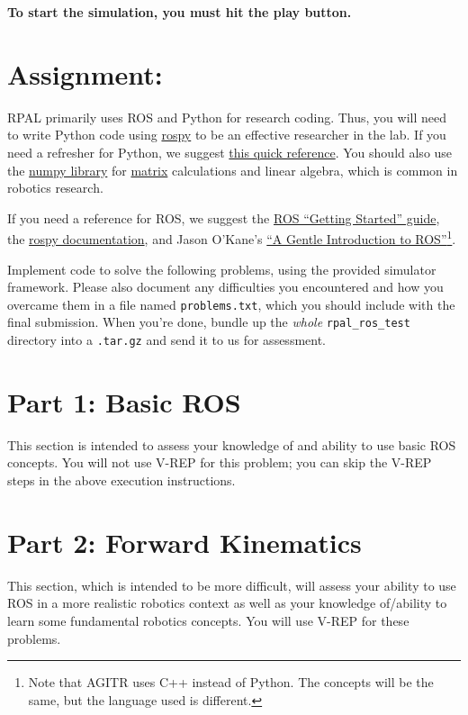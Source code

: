 \documentclass[11pt]{article}
\begin{document}
\textbf{To start the simulation, you must hit the play button.}

\section{Assignment:}

RPAL primarily uses ROS and Python for research coding. Thus, you will need to write Python code
using \href{http://wiki.ros.org/rospy}{rospy} to be an effective researcher in the lab. If you need
a refresher for Python, we suggest \href{https://learnxinyminutes.com/docs/python/}{this quick
reference}. You should also use the \href{http://www.numpy.org/}{numpy library} for
\href{https://docs.scipy.org/doc/numpy-1.14.0/reference/generated/numpy.matrix.html}{matrix}
calculations and linear algebra, which is common in robotics research.

If you need a reference for ROS, we suggest the \href{http://wiki.ros.org/ROS/StartGuide}{ROS
``Getting Started'' guide}, the \href{http://wiki.ros.org/rospy}{rospy documentation}, and Jason
O'Kane's \href{https://cse.sc.edu/~jokane/agitr/agitr-letter.pdf}{``A Gentle Introduction to
ROS''}\footnote{Note that AGITR uses C++ instead of Python. The concepts will be the same, but the
language used is different.}.

Implement code to solve the following problems, using the provided simulator framework. Please also
document any difficulties you encountered and how you overcame them in a file named
\texttt{problems.txt}, which you should include with the final submission. When you're done, bundle
up the \emph{whole} \texttt{rpal\_ros\_test} directory into a \texttt{.tar.gz} and send it to us for
assessment.

\section{Part 1: Basic ROS}

This section is intended to assess your knowledge of and ability to use basic ROS concepts. You will
not use V-REP for this problem; you can skip the V-REP steps in the above execution instructions.






\section{Part 2: Forward Kinematics}

This section, which is intended to be more difficult, will assess your ability to use ROS in a more
realistic robotics context as well as your knowledge of/ability to learn some fundamental robotics
concepts. You will use V-REP for these problems.



\end{document}
